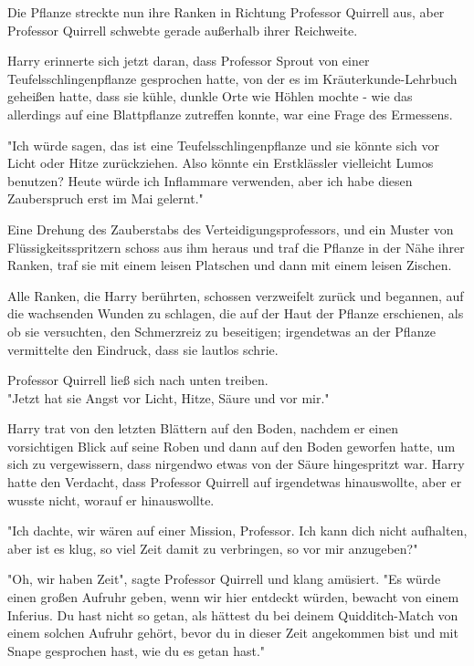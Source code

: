 {Die Pflanze streckte nun ihre Ranken in Richtung Professor Quirrell aus, aber Professor Quirrell schwebte gerade außerhalb ihrer Reichweite.

Harry erinnerte sich jetzt daran, dass Professor Sprout von einer Teufelsschlingenpflanze gesprochen hatte, von der es im Kräuterkunde-Lehrbuch geheißen hatte, dass sie kühle, dunkle Orte wie Höhlen mochte - wie das allerdings auf eine Blattpflanze zutreffen konnte, war eine Frage des Ermessens.

"Ich würde sagen, das ist eine Teufelsschlingenpflanze und sie könnte sich vor Licht oder Hitze zurückziehen. Also könnte ein Erstklässler vielleicht Lumos benutzen? Heute würde ich Inflammare verwenden, aber ich habe diesen Zauberspruch erst im Mai gelernt."

Eine Drehung des Zauberstabs des Verteidigungsprofessors, und ein Muster von Flüssigkeitsspritzern schoss aus ihm heraus und traf die Pflanze in der Nähe ihrer Ranken, traf sie mit einem leisen Platschen und dann mit einem leisen Zischen.

Alle Ranken, die Harry berührten, schossen verzweifelt zurück und begannen, auf die wachsenden Wunden zu schlagen, die auf der Haut der Pflanze erschienen, als ob sie versuchten, den Schmerzreiz zu beseitigen; irgendetwas an der Pflanze vermittelte den Eindruck, dass sie lautlos schrie.

Professor Quirrell ließ sich nach unten treiben.\\ "Jetzt hat sie Angst vor Licht, Hitze, Säure und vor mir."

Harry trat von den letzten Blättern auf den Boden, nachdem er einen vorsichtigen Blick auf seine Roben und dann auf den Boden geworfen hatte, um sich zu vergewissern, dass nirgendwo etwas von der Säure hingespritzt war. Harry hatte den Verdacht, dass Professor Quirrell auf irgendetwas hinauswollte, aber er wusste nicht, worauf er hinauswollte.

"Ich dachte, wir wären auf einer Mission, Professor. Ich kann dich nicht aufhalten, aber ist es klug, so viel Zeit damit zu verbringen, so vor mir anzugeben?"

"Oh, wir haben Zeit", sagte Professor Quirrell und klang amüsiert. "Es würde einen großen Aufruhr geben, wenn wir hier entdeckt würden, bewacht von einem Inferius. Du hast nicht so getan, als hättest du bei deinem Quidditch-Match von einem solchen Aufruhr gehört, bevor du in dieser Zeit angekommen bist und mit Snape gesprochen hast, wie du es getan hast."

}
